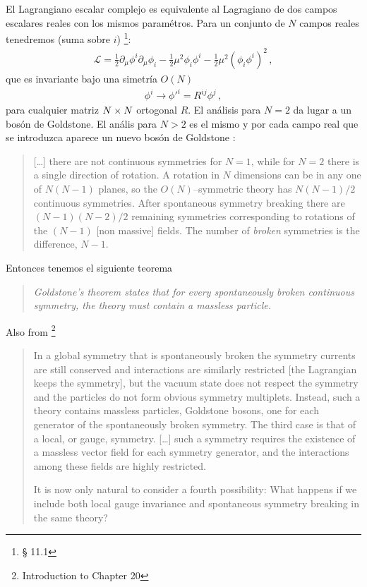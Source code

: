 \begin{frame}
El Lagrangiano escalar complejo es equivalente al Lagragiano de dos campos escalares reales con los mismos paramétros. Para un conjunto de $N$ campos reales tenedremos (suma sobre $i$) \cite{Peskin}\footnote{§ 11.1}: 
\begin{align}
  \mathcal{L}=\frac{1}{2}\partial_\mu\phi^i\partial_\mu\phi_i-\frac{1}{2}\mu^2\phi_i\phi^i-\frac{1}{2}\mu^2\left(\phi_i\phi^i\right)^2\,,
\end{align}
que es invariante bajo una simetría $O(N)$
\begin{align}
  \phi^i\to{\phi'}^i=R^{ij}\phi^j\,,
\end{align}
para cualquier matriz $N\times  N$ ortogonal $R$. El análisis para $N=2$ da lugar a un bosón de Goldstone. El anális para $N>2$ es el mismo y por cada campo real que se introduzca aparece un nuevo bosón de Goldstone \cite{Peskin}:
\begin{quote}
  [\ldots] there are not continuous symmetries for $N=1$, while for $N=2$ there is a single direction of rotation. A rotation in $N$ dimensions can be in any one of $N(N-1)$ planes, so the $O(N)$--symmetric theory has $N(N-1)/2$ continuous symmetries. After spontaneous symmetry breaking there are $(N-1)(N-2)/2$  remaining symmetries corresponding to rotations of the $(N-1)$ [non massive] fields. The number of \emph{broken} symmetries is the difference, $N-1$.
\end{quote}
Entonces tenemos el siguiente teorema \cite{Peskin}
\begin{quote}
\emph{Goldstone's theorem states that for every spontaneously broken continuous symmetry, the theory must contain a massless particle.}
\end{quote}

Also from \cite{Peskin}\footnote{Introduction to Chapter 20}
\begin{quote}
  In a global symmetry  that is spontaneously broken the symmetry currents are still conserved and interactions are similarly restricted [the Lagrangian keeps the symmetry], but the vacuum state does not respect the symmetry and the particles do not form obvious symmetry multiplets. Instead, such a theory contains massless particles, Goldstone bosons, one for each generator of the spontaneously broken symmetry. The third case is that of a local, or gauge, symmetry. [\ldots] such a symmetry requires the existence of a massless vector field for each symmetry generator, and the interactions among these fields are highly restricted.

It is now only natural to consider a fourth possibility: What happens if we include both local gauge invariance  and spontaneous symmetry breaking in the same theory?
\end{quote}
 


\end{frame}
